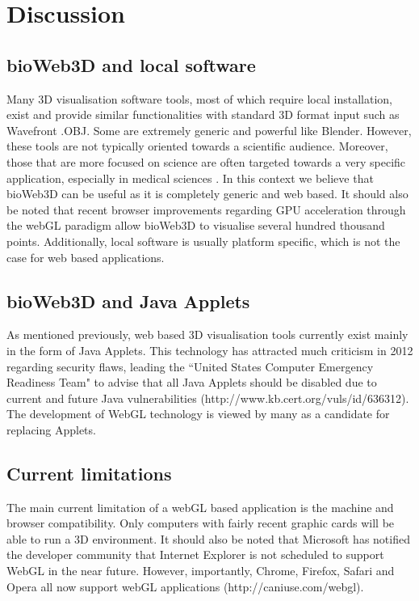 \documentclass{bioinfo}
\begin{document}
\section{Discussion}
	\subsection{bioWeb3D and local software}
Many 3D visualisation software tools, most of which require local installation, exist and provide similar functionalities with standard 3D format input such as Wavefront .OBJ. Some are extremely generic and powerful like Blender. However, these tools are not typically oriented towards a scientific audience. Moreover, those that are more focused on science are often targeted towards a very specific application, especially in medical sciences \citep{Wang09}. In this context we believe that bioWeb3D can be useful as it is completely generic and web based. It should also be noted that recent browser improvements regarding GPU acceleration through the webGL paradigm allow bioWeb3D to visualise several hundred thousand points. Additionally, local software is usually platform specific, which is not the case for web based applications.

	\subsection{bioWeb3D and Java Applets}
As mentioned previously, web based 3D visualisation tools currently exist mainly in the form of Java Applets. This technology has attracted much criticism in 2012 regarding security flaws, leading the ``United States Computer Emergency Readiness Team" to advise that all Java Applets should be disabled due to current and future Java vulnerabilities (http://www.kb.cert.org/vuls/id/636312). The development of WebGL technology is viewed by many as a candidate for replacing Applets. 

	\subsection{Current limitations}
The main current limitation of a webGL based application is the machine and browser compatibility. Only computers with fairly recent graphic cards will be able to run a 3D environment. It should also be noted that Microsoft has notified the developer community that Internet Explorer is not scheduled to support WebGL in the near future. However, importantly, Chrome, Firefox, Safari and Opera all now support webGL applications (http://caniuse.com/webgl).
\end{document}
